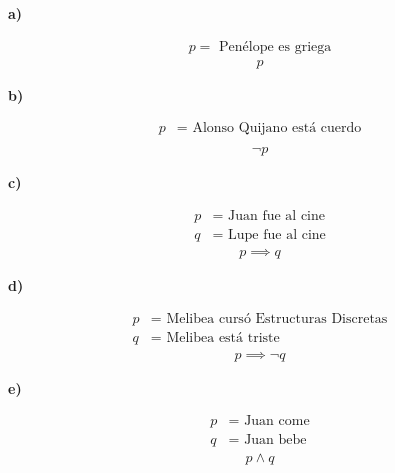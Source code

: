 \textbf{a)}
\vspace{-20px}
\begin{multicols}{2}
    \noindent
    \begin{gather*}
        p = \text{ Penélope es griega}
    \end{gather*}
    \columnbreak
    \begin{gather*}
        p 
    \end{gather*}
\end{multicols}
\textbf{b)}
\vspace{-10px}
\begin{multicols}{2}
    \noindent
    \begin{align*}
        p &= \text{ Alonso Quijano está cuerdo}\\
    \end{align*}
    \columnbreak
    \begin{align*}
        \neg p
    \end{align*}
\end{multicols}
\textbf{c)}
\vspace{-20px}
\begin{multicols}{2}
    \noindent
    \begin{align*}
        p &= \text{ Juan fue al cine}\\
        q &= \text{ Lupe fue al cine}
    \end{align*}
    \columnbreak
    \begin{align*}
        p\implies q
    \end{align*}
\end{multicols}
\textbf{d)}
\vspace{-20px}
\begin{multicols}{2}
    \noindent
    \begin{align*}
        p &= \text{ Melibea cursó Estructuras Discretas}\\
        q &= \text{ Melibea está triste}
    \end{align*}
    \columnbreak
    \begin{align*}
        p\implies \neg q
    \end{align*}
\end{multicols}
\textbf{e)}
\vspace{-20px}
\begin{multicols}{2}
    \noindent
    \begin{align*}
        p &= \text{ Juan come}\\
        q &= \text{ Juan bebe}
    \end{align*}
    \columnbreak
    \begin{align*}
        p\land  q
    \end{align*}
\end{multicols}
